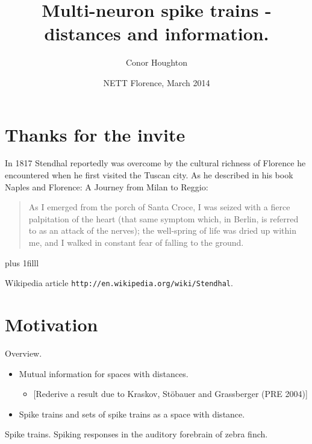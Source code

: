 \documentclass{beamer}
\title[Multi-neuron spike trains - distances and information.]{Multi-neuron spike trains - distances and information.}
\author{Conor Houghton}
\institute{Computer Science, U Bristol}
\date{NETT Florence, March 2014}
\newcommand{\btVFill}{\vskip0pt plus 1filll}
\begin{document}
\setlength{\unitlength}{1mm}
\begin{frame}
\titlepage
\end{frame}


\section{Thanks for the invite}


\begin{frame}{}
\color{black} 
In 1817 Stendhal reportedly was overcome by the cultural
richness of Florence he encountered when he first visited the Tuscan
city. As he described in his book Naples and Florence: A Journey from
Milan to Reggio:
\begin{quote}
As I emerged from the porch of Santa Croce, I was seized with a fierce palpitation of the heart (that same symptom which, in Berlin, is referred to as an attack of the nerves); the well-spring of life was dried up within me, and I walked in constant fear of falling to the ground.
\end{quote}
\btVFill
\begin{flushright}
\tiny{Wikipedia article \texttt{http://en.wikipedia.org/wiki/Stendhal}.}
\end{flushright}
\end{frame}



\section{Motivation}


\begin{frame}{Overview.}
\color{black}
\begin{itemize}
\item Mutual information for spaces with distances.
\begin{itemize}
\item{} [Rederive a result due to Kraskov, St\"{o}bauer and Grassberger (PRE 2004)]
\end{itemize}
\item Spike trains and sets of spike trains as a space with distance.
\end{itemize} 
\color{black}
\end{frame}

\begin{frame}{Spike trains.}
Spiking responses in the auditory forebrain of zebra finch.
\color{reddish}

\color{black}
\end{frame}
\end{document}
